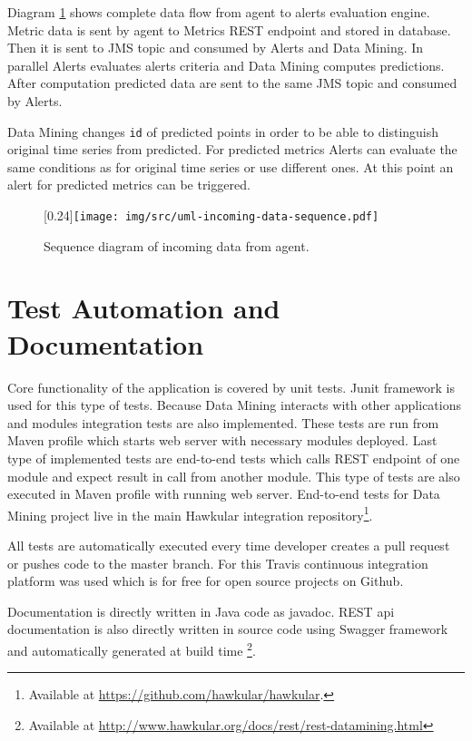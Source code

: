     Diagram \ref{img:sequence-incoming-data} shows complete data flow from agent to alerts evaluation engine.
    Metric data is sent by agent to Metrics REST endpoint and stored in database. Then it is sent to JMS topic and
    consumed by Alerts and Data Mining. In parallel Alerts evaluates alerts criteria and Data Mining computes
    predictions. After computation predicted data are sent to the same JMS topic and consumed by Alerts.

    Data Mining changes \texttt{id} of predicted points in order to be able to distinguish original time series from
    predicted. For predicted metrics Alerts can evaluate the same conditions as for original time series or use
    different ones. At this point an alert for predicted metrics can be triggered.

    \begin{figure}[H]
        \begin{center}
            \scalebox{0.33}[0.24]{\texttt{[image: img/src/uml-incoming-data-sequence.pdf]}}
            \caption{Sequence diagram of incoming data from agent.}
            \label{img:sequence-incoming-data}
        \end{center}
    \end{figure}

    \section{Test Automation and Documentation}
    Core functionality of the application is covered by unit tests. Junit framework is used for this type of tests.
    Because Data Mining interacts with other applications and modules integration tests are also implemented. These
    tests are run from Maven profile which starts web server with necessary modules deployed.
    Last type of implemented tests are end-to-end tests which calls REST endpoint of one module and expect result
    in call from another module. This type of tests are also executed in Maven profile with running web server.
    End-to-end tests for Data Mining project live in the main Hawkular integration repository\footnote{
    Available at \url{https://github.com/hawkular/hawkular}.}.

    All tests are automatically executed every time developer creates a pull request or pushes code to the master
    branch. For this Travis continuous integration platform was used which is for free for open source projects on
    Github.

    Documentation is directly written in Java code as javadoc. REST api documentation is also directly
    written in source code using Swagger framework and automatically generated at build time
    \footnote{Available at \url{http://www.hawkular.org/docs/rest/rest-datamining.html}}.

